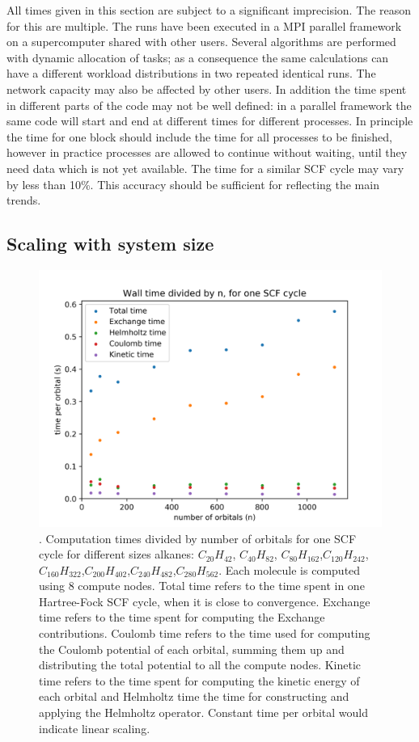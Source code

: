 \documentclass{article}
\begin{document}
All times given in this section are subject to a significant imprecision. The reason for this are multiple. The runs have been executed in a MPI parallel framework on a supercomputer shared with other users. Several algorithms are performed with dynamic allocation of tasks; as a consequence the same calculations can have a different workload distributions in two repeated identical runs. The network capacity may also be affected by other users. In addition the time spent in different parts of the code may not be well defined: in a parallel framework the same code will start and end at different times for different processes. In principle the time for one block should include the time for all processes to be finished, however in practice processes are allowed to continue without waiting, until they need data which is not yet available.
The time for a similar SCF cycle may vary by less than 10\%. This accuracy should be sufficient for reflecting the main trends. 

\subsection{Scaling with system size}

\begin{figure}
\centering
\includegraphics[width=1.\textwidth]{Times_nAlkanes.png}
\caption{\label{fig01}. Computation times divided by number of orbitals for one SCF cycle for different sizes alkanes: $C_{20}H_{42}$, $C_{40}H_{82}$, $C_{80}H_{162}$,$ C_{120}H_{242}$,$ C_{160}H_{322}$,$ C_{200}H_{402}$,$ C_{240}H_{482}$,$ C_{280}H_{562}$. Each molecule is computed using 8 compute nodes. Total time refers to the time spent in one Hartree-Fock SCF cycle, when it is close to convergence. Exchange time refers to the time spent for computing the Exchange contributions. Coulomb time refers to the time used for computing the Coulomb potential of each orbital, summing them up and distributing the total potential to all the compute nodes. Kinetic time refers to the time spent for computing the kinetic energy of each orbital  and Helmholtz time the time for constructing and applying the Helmholtz operator. Constant time per orbital would indicate linear scaling.}
\end{figure}
\end{document}
